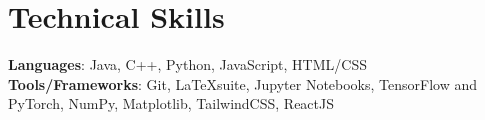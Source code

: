 \documentclass[letterpaper,10.5pt]{article}
\makeatletter
\newcommand{\resumeItem}[1]{
  \item\small{
    {#1 \vspace{-1pt}}
  }
}
\newcommand{\resumeProjectHeading}[2]{
    \item
    \begin{tabular*}{0.97\textwidth}{l@{\extracolsep{\fill}}r}
      \small#1 & #2 \\
    \end{tabular*}\vspace{-4pt}
}
\newcommand{\resumeSubHeadingListStart}{\begin{itemize}[leftmargin=0.15in, label={}]}
\newcommand{\resumeSubHeadingListEnd}{\end{itemize}}
\newcommand{\resumeItemListStart}{\begin{itemize}}
\newcommand{\resumeItemListEnd}{\end{itemize}\vspace{-5pt}}
\makeatother
\begin{document}
    \section{Technical Skills}
    \begin{itemize}[leftmargin=0.15in, label={}]
      \small{\item{
        \textbf{Languages}{: Java, C++, Python, JavaScript, HTML/CSS} \\
        \textbf{Tools/Frameworks}{: Git, \LaTeX\hspace{0.1cm}suite, Jupyter Notebooks, TensorFlow and PyTorch, NumPy, Matplotlib, TailwindCSS, ReactJS
        }
      }}
    \end{itemize}



\end{document}
